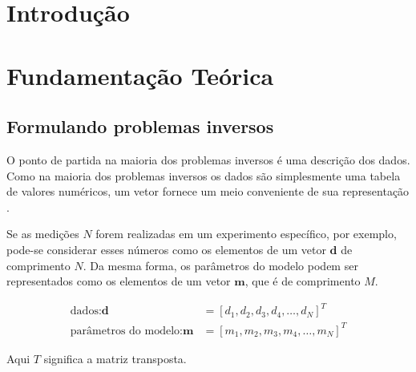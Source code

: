 \documentclass[a4paper, 12 pt]{article} %
\begin{document}

\begin{center}
\tableofcontents \newpage %
\end{center}

\clearpage


\section[Introdução]{Introdução}


\blindtext 
%
\blindtext 
%
\blindtext 
%
\blindtext


\clearpage


\section{Fundamentação Teórica}

\subsection{Formulando problemas inversos}

O ponto de partida na maioria dos problemas inversos é uma descrição dos dados. Como na maioria dos problemas inversos os dados são simplesmente uma tabela de valores numéricos, um vetor fornece um meio conveniente de sua representação \citep{menke1984geophysical}.

Se as medições $N$ forem realizadas em um experimento específico, por exemplo, pode-se considerar esses números como os elementos de um vetor $\textbf{d}$ de comprimento $N$. Da mesma forma, os parâmetros do modelo podem ser representados como os elementos de um vetor $\textbf{m}$, que é de comprimento $M$.

\begin{equation}\label{eq:tomography}
\begin{split}
\textrm{dados}: \textbf{d} &= [d_{1}, d_{2}, d_{3}, d_{4}, \dots, d_{N}]^T \\
\textrm{parâmetros do modelo}: \textbf{m} &= [m_{1}, m_{2}, m_{3}, m_{4}, \dots, m_{N}]^T
\end{split}
\end{equation}

Aqui $T$ significa a matriz transposta. 
\end{document}
